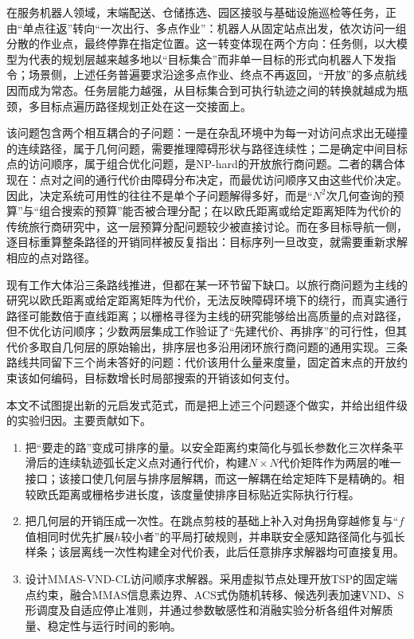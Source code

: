 \documentclass[lettersize,journal]{IEEEtran}
\begin{document}
在服务机器人领域，末端配送、仓储拣选、园区接驳与基础设施巡检等任务，正由“单点往返”转向“一次出行、多点作业”：机器人从固定站点出发，依次访问一组分散的作业点，最终停靠在指定位置\cite{ref37,ref38}。这一转变体现在两个方向：任务侧，以大模型为代表的规划层越来越多地以“目标集合”而非单一目标的形式向机器人下发指令\cite{ref45}；场景侧，上述任务普遍要求沿途多点作业、终点不再返回，“开放”的多点航线因而成为常态。任务层能力越强，从目标集合到可执行轨迹之间的转换就越成为瓶颈，多目标点遍历路径规划正处在这一交接面上。

该问题包含两个相互耦合的子问题：一是在杂乱环境中为每一对访问点求出无碰撞的连续路径，属于几何问题，需要推理障碍形状与路径连续性；二是确定中间目标点的访问顺序，属于组合优化问题，是NP-hard的开放旅行商问题。二者的耦合体现在：点对之间的通行代价由障碍分布决定，而最优访问顺序又由这些代价决定。因此，决定系统可用性的往往不是单个子问题解得多好，而是“$N^2$次几何查询的预算”与“组合搜索的预算”能否被合理分配；在以欧氏距离或给定距离矩阵为代价的传统旅行商研究中，这一层预算分配问题较少被直接讨论\cite{ref4,ref36,ref39}。而在多目标导航一侧，逐目标重算整条路径的开销同样被反复指出：目标序列一旦改变，就需要重新求解相应的点对路径\cite{ref47}。

现有工作大体沿三条路线推进，但都在某一环节留下缺口。以旅行商问题为主线的研究以欧氏距离或给定距离矩阵为代价\cite{ref4,ref36}，无法反映障碍环境下的绕行，而真实通行路径可能数倍于直线距离\cite{ref39}；以栅格寻径为主线的研究能够给出高质量的点对路径，但不优化访问顺序\cite{ref5,ref6,ref7,ref33}；少数两层集成工作验证了“先建代价、再排序”的可行性\cite{ref1,ref2,ref18}，但其代价多取自几何层的原始输出，排序层也多沿用闭环旅行商问题的通用实现。三条路线共同留下三个尚未答好的问题：代价该用什么量来度量，固定首末点的开放约束该如何编码，目标数增长时局部搜索的开销该如何支付。

本文不试图提出新的元启发式范式，而是把上述三个问题逐个做实，并给出组件级的实验归因。主要贡献如下。

\begin{enumerate}

\item 把“要走的路”变成可排序的量。以安全距离约束简化与弧长参数化三次样条平滑后的连续轨迹弧长定义点对通行代价，构建$N \times N$代价矩阵作为两层的唯一接口；该接口使几何层与排序层解耦，而这一解耦在给定矩阵下是精确的。相较欧氏距离或栅格步进长度，该度量使排序目标贴近实际执行行程。

\item 把几何层的开销压成一次性。在跳点剪枝的基础上补入对角拐角穿越修复与“$f$值相同时优先扩展$h$较小者”的平局打破规则，并串联安全感知路径简化与弧长样条；该层离线一次性构建全对代价表，此后任意排序求解器均可直接复用。

\item 设计MMAS-VND-CL访问顺序求解器。采用虚拟节点处理开放TSP的固定端点约束，融合MMAS信息素边界、ACS式伪随机转移、候选列表加速VND、S形调度及自适应停止准则，并通过参数敏感性和消融实验分析各组件对解质量、稳定性与运行时间的影响。

\end{enumerate}
\end{document}
